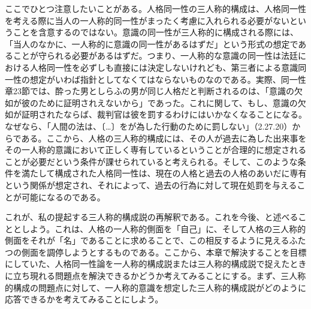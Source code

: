 \documentclass[a4j,oneside]{jsbook}
\begin{document}
ここでひとつ注意したいことがある。人格同一性の三人称的構成は、人格同一性を考える際に当人の一人称的同一性がまったく考慮に入れられる必要がないということを含意するのではない。意識の同一性が三人称的に構成される際には、「当人のなかに、一人称的に意識の同一性があるはずだ」という形式の想定であることが守られる必要があるはずだ。つまり、一人称的な意識の同一性は法廷における人格同一性を必ずしも直接には決定しないけれども、第三者による意識同一性の想定がいわば指針としてなくてはならないものなのである。実際、同一性章23節では、酔った男としらふの男が同じ人格だと判断されるのは、「意識の欠如が彼のために証明されえないから」であった。これに関して、もし、意識の欠如が証明されたならば、裁判官は彼を罰するわけにはいかなくなることになる。なぜなら、「人間の法は、〔…〕をが為した行動のために罰しない」（2.27.20）からである。ここから、人格の三人称的構成には、その人が過去に為した出来事をその一人称的意識において正しく専有しているということが合理的に想定されることが必要だという条件が課せられていると考えられる。そして、このような条件を満たして構成された人格同一性は、現在の人格と過去の人格のあいだに専有という関係が想定され、それによって、過去の行為に対して現在処罰を与えることが可能になるのである。
\par
これが、私の提起する三人称的構成説の再解釈である。これを今後、と述べることとしよう。これは、人格の一人称的側面を「自己」に、そして人格の三人称的側面をそれが「名」であることに求めることで、この相反するように見えるふたつの側面を調停しようとするものである。ここから、本章で解決することを目標にしていた、人格同一性論を一人称的構成説または三人称的構成説で捉えたときに立ち現れる問題点を解決できるかどうか考えてみることにする。まず、三人称的構成の問題点に対して、一人称的意識を想定した三人称的構成説がどのように応答できるかを考えてみることにしよう。
\par
\end{document}
